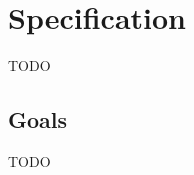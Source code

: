 \chapter{Specification} %
\label{cha:Specification}

TODO

\section{Goals} %
\label{sec:Goals}

TODO






